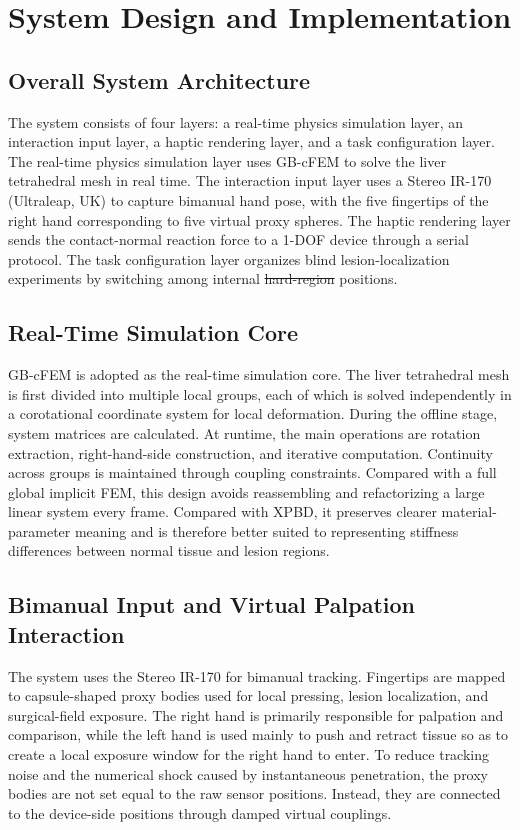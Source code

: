 \documentclass{ieeeaccess}
\makeatletter
\providecommand{\DIFadd}[1]{{\protect\color{blue}\uwave{#1}}} %
\providecommand{\DIFdel}[1]{{\protect\color{red}\sout{#1}}} %
\providecommand{\DIFaddbegin}{} %
\providecommand{\DIFaddend}{} %
\providecommand{\DIFdelbegin}{} %
\providecommand{\DIFdelend}{} %
\newcommand{\DIFscaledelfig}{0.5}
\newlength{\DIFdelgraphicswidth} %
\newlength{\DIFdelgraphicsheight} %
\newcommand{\DIFaddincludegraphics}[2][]{{\color{blue}\fbox{\DIFOincludegraphics[#1]{#2}}}} %
\newcommand{\DIFdelincludegraphics}[2][]{%
\sbox{\DIFdelgraphicsbox}{\DIFOincludegraphics[#1]{#2}}%
\settoboxwidth{\DIFdelgraphicswidth}{\DIFdelgraphicsbox} %
\settoboxtotalheight{\DIFdelgraphicsheight}{\DIFdelgraphicsbox} %
\scalebox{\DIFscaledelfig}{%
\parbox[b]{\DIFdelgraphicswidth}{\usebox{\DIFdelgraphicsbox}\\[-\baselineskip] \rule{\DIFdelgraphicswidth}{0em}}\llap{\resizebox{\DIFdelgraphicswidth}{\DIFdelgraphicsheight}{%
\setlength{\unitlength}{\DIFdelgraphicswidth}%
\begin{picture}(1,1)%
\thicklines\linethickness{2pt} %
{\color[rgb]{1,0,0}\put(0,0){\framebox(1,1){}}}%
{\color[rgb]{1,0,0}\put(0,0){\line( 1,1){1}}}%
{\color[rgb]{1,0,0}\put(0,1){\line(1,-1){1}}}%
\end{picture}%
}\hspace*{3pt}}} %
} %
\DeclareRobustCommand{\DIFaddbegin}{\DIFOaddbegin \let\includegraphics\DIFaddincludegraphics} %
\DeclareRobustCommand{\DIFaddend}{\DIFOaddend \let\includegraphics\DIFOincludegraphics} %
\DeclareRobustCommand{\DIFdelbegin}{\DIFOdelbegin \let\includegraphics\DIFdelincludegraphics} %
\DeclareRobustCommand{\DIFdelend}{\DIFOaddend \let\includegraphics\DIFOincludegraphics} %
\let\sout@orig\sout %
\renewcommand{\sout}[1]{\ifmmode\text{\sout@orig{\ensuremath{#1}}}\else\sout@orig{#1}\fi} %
\makeatother
\begin{document}
\section{System Design and Implementation}
\DIFaddbegin 

\DIFaddend \subsection{Overall System Architecture}
The system consists of four layers: a real-time physics simulation layer, an interaction input layer, a haptic rendering layer, and a task configuration layer. The real-time physics simulation layer uses GB-cFEM to solve the liver tetrahedral mesh in real time. The interaction input layer uses a Stereo IR-170 (Ultraleap, UK) to capture bimanual hand pose, with the five fingertips of the right hand corresponding to five virtual proxy spheres. The haptic rendering layer sends the contact-normal reaction force to a 1-DOF device through a serial protocol. The task configuration layer organizes blind lesion-localization experiments by switching among internal \DIFdelbegin \DIFdel{hard-region }\DIFdelend \DIFaddbegin \DIFadd{lesion }\DIFaddend positions.

\subsection{Real-Time Simulation Core}
GB-cFEM is adopted as the real-time simulation core. The liver tetrahedral mesh is first divided into multiple local groups, each of which is solved independently in a corotational coordinate system for local deformation. During the offline stage, system matrices are calculated. At runtime, the main operations are rotation extraction, right-hand-side construction, and iterative computation. Continuity across groups is maintained through coupling constraints. Compared with a full global implicit FEM, this design avoids reassembling and refactorizing a large linear system every frame. Compared with XPBD, it preserves clearer material-parameter meaning and is therefore better suited to representing stiffness differences between normal tissue and lesion regions.

\subsection{Bimanual Input and Virtual Palpation Interaction}
The system uses the Stereo IR-170 for bimanual tracking. Fingertips are mapped to capsule-shaped proxy bodies used for local pressing, lesion localization, and surgical-field exposure. The right hand is primarily responsible for palpation and comparison, while the left hand is used mainly to push and retract tissue so as to create a local exposure window for the right hand to enter. To reduce tracking noise and the numerical shock caused by instantaneous penetration, the proxy bodies are not set equal to the raw sensor positions. Instead, they are connected to the device-side positions through damped virtual couplings.
\end{document}
